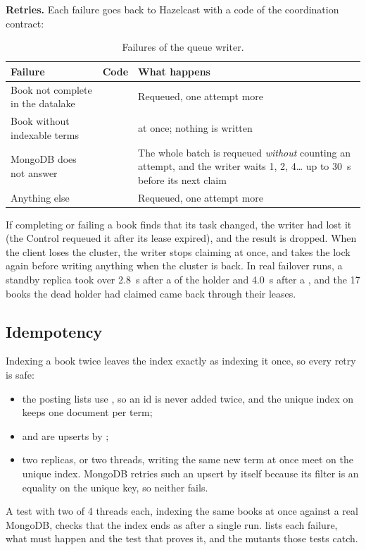 \textbf{Retries.} Each failure goes back to Hazelcast with a code of the coordination contract:

\begin{table}[H]
\centering\small
\begin{tabularx}{\linewidth}{@{}L{4.6cm}L{4cm}X@{}}
\toprule
\textbf{Failure} & \textbf{Code} & \textbf{What happens} \\
\midrule
Book not complete in the datalake &  & Requeued, one attempt more \\
Book without indexable terms &  &  at once; nothing is written \\
MongoDB does not answer &  & The whole batch is requeued \emph{without} counting an attempt,
  and the writer waits 1, 2, 4\ldots{} up to 30~s before its next claim \\
Anything else &  & Requeued, one attempt more \\
\bottomrule
\end{tabularx}
\caption{Failures of the queue writer.}
\end{table}

If completing or failing a book finds that its task changed, the writer had lost it (the Control requeued it after its
lease expired), and the result is dropped. When the client loses the cluster, the writer stops claiming at once, and
takes the lock again before writing anything when the cluster is back. In real failover runs, a standby replica
took over 2.8~s after a  of the holder and 4.0~s after a , and the 17 books the dead holder had
claimed came back through their leases.

\subsection{Idempotency}

Indexing a book twice leaves the index exactly as indexing it once, so every retry is safe:
\begin{itemize}
  \item the posting lists use , so an id is never added twice, and the unique index on  keeps
        one document per term;
  \item {} and  are upserts by ;
  \item two replicas, or two threads, writing the same new term at once meet on the unique index. MongoDB retries such
        an upsert by itself because its filter is an equality on the unique key, so neither fails.
\end{itemize}
A test with two  of 4 threads each, indexing the same books at once against a real MongoDB,
checks that the index ends as after a single run.  lists each failure, what must happen and
the test that proves it, and the mutants those tests catch.

